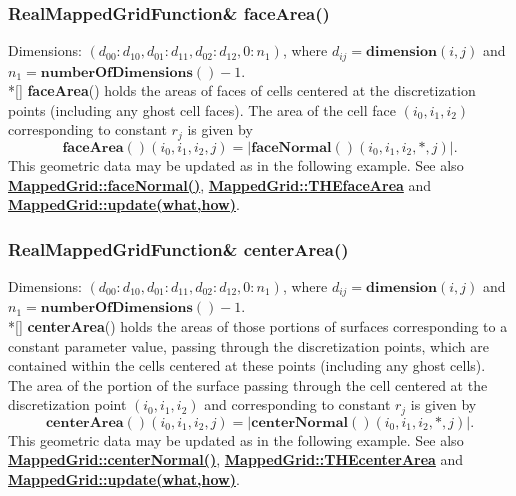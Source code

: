 \documentclass{article}
\begin{document}
  \subsubsection{RealMappedGridFunction\& faceArea()}
  \label{MappedGrid::faceArea()}
    Dimensions: $(d_{00}\colon d_{10},d_{01}\colon d_{11},d_{02}\colon d_{12},0\colon n_1)$,
    where $d_{ij} = \textbf{dimension}(i,j)$ and $n_1 = \textbf{numberOfDimensions}() - 1$. \\*[\parskip]
    \textbf{faceArea}() holds the areas of faces of cells centered at the discretization points (including any ghost cell faces).
    The area of the cell face $(i_0,i_1,i_2)$ corresponding to constant $r_j$ is given by
    \[
      \textbf{faceArea}()(i_0,i_1,i_2,j) = \big|\textbf{faceNormal}()(i_0,i_1,i_2,\ast,j)\big|.
    \]
    This geometric data may be updated as in the following example.
    See also {\bf{}\hyperref{faceNormal()}{faceNormal() \rm(\S}{)}{MappedGrid::faceNormal()}},
    {\bf{}\hyperref{THEfaceArea}{THEfaceArea \rm(\S}{)}{MappedGrid::THEfaceArea}}
    and {\bf{}\hyperref{update(what,how)}{update(what,how) \rm(\S}{)}{MappedGrid::update(what,how)}}.


  \subsubsection{RealMappedGridFunction\& centerArea()}
  \label{MappedGrid::centerArea()}
    Dimensions: $(d_{00}\colon d_{10},d_{01}\colon d_{11},d_{02}\colon d_{12},0\colon n_1)$,
    where $d_{ij} = \textbf{dimension}(i,j)$ and $n_1 = \textbf{numberOfDimensions}() - 1$. \\*[\parskip]
    \textbf{centerArea}() holds the areas of those portions of surfaces corresponding to a constant parameter value, passing through the
    discretization points, which are contained within the cells centered at these points (including any ghost cells).
    The area of the portion of the surface passing through the cell centered at the discretization point $(i_0,i_1,i_2)$ and
    corresponding to constant $r_j$ is given by
    \[
      \textbf{centerArea}()(i_0,i_1,i_2,j) = \big|\textbf{centerNormal}()(i_0,i_1,i_2,\ast,j)\big|.
    \]
    This geometric data may be updated as in the following example.
    See also {\bf{}\hyperref{centerNormal()}{centerNormal() \rm(\S}{)}{MappedGrid::centerNormal()}},
    {\bf{}\hyperref{THEcenterArea}{THEcenterArea \rm(\S}{)}{MappedGrid::THEcenterArea}}
    and {\bf{}\hyperref{update(what,how)}{update(what,how) \rm(\S}{)}{MappedGrid::update(what,how)}}.
\end{document}
